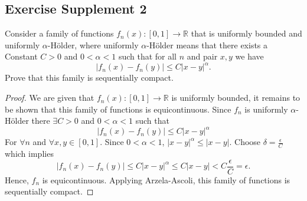 \documentclass{tufte-book}
\theoremstyle{mytheoremstyle}
\theoremstyle{mylemstyle}
\theoremstyle{mydefstyle}
\begin{document}
\subsection{Exercise Supplement 2}
Consider a family of functions $f_n(x): [0,1] \to \mathbb{R}$ that is uniformly bounded and uniformly $\alpha$-H{\"o}lder, where uniformly $\alpha$-H{\"o}lder means that there exists a Constant $C>0$ and $0<\alpha<1$ such that for all $n$ and pair $x,y$ we have
\[|f_n(x) - f_n(y)| \leq C|x-y|^\alpha. \]
Prove that this family is sequentially compact.

\begin{proof}
We are given that $f_n(x): [0,1] \to \mathbb{R}$ is uniformly bounded, it remains to be shown that this family of functions is equicontinuous.  Since $f_n$ is uniformly $\alpha$-H{\"o}lder there $\exists C>0$ and $0<\alpha<1$ such that 
\[|f_n(x) - f_n(y)| \leq C|x-y|^\alpha \]
For $\forall n$ and $\forall x,y \in [0,1]$.  Since $0<\alpha<1$, $|x-y|^\alpha \leq |x-y|$.  Choose $\delta = \frac{\epsilon}{C}$ which implies
\[|f_n(x) - f_n(y)| \leq C|x-y|^\alpha \leq C|x-y| < C \frac{\epsilon}{C} = \epsilon .\]
Hence, $f_n$ is equicontinuous.  Applying Arzela-Ascoli, this family of functions is sequentially compact.
\end{proof}
\end{document}
